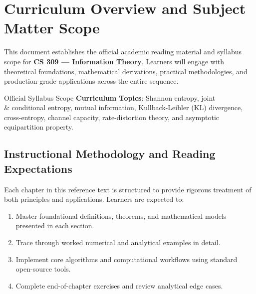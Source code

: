 \section{Curriculum Overview and Subject Matter Scope}

This document establishes the official academic reading material and syllabus scope for \textbf{CS 309 --- Information Theory}. Learners will engage with theoretical foundations, mathematical derivations, practical methodologies, and production-grade applications across the entire sequence.

\begin{InsightBox}{Official Syllabus Scope}
  \textbf{Curriculum Topics}: Shannon entropy, joint \\& conditional entropy, mutual information, Kullback-Leibler (KL) divergence, cross-entropy, channel capacity, rate-distortion theory, and asymptotic equipartition property.
\end{InsightBox}

\subsection{Instructional Methodology and Reading Expectations}

Each chapter in this reference text is structured to provide rigorous treatment of both principles and applications. Learners are expected to:
\begin{enumerate}
  \item Master foundational definitions, theorems, and mathematical models presented in each section.
  \item Trace through worked numerical and analytical examples in detail.
  \item Implement core algorithms and computational workflows using standard open-source tools.
  \item Complete end-of-chapter exercises and review analytical edge cases.
\end{enumerate}

